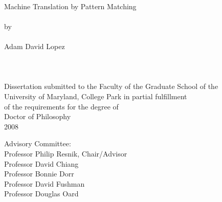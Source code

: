 
\thispagestyle{empty}
\hbox{\ }
\vspace{1in}
\small\normalsize
\begin{center}

\huge{{\sc Machine Translation by Pattern Matching}}\\
\ \\
\large{by} \\
\ \\
\large{Adam David Lopez}%
\ \\
\ \\
\ \\
\ \\
\normalsize
Dissertation submitted to the Faculty of the Graduate School of the \\
University of Maryland, College Park in partial fulfillment \\
of the requirements for the degree of \\
Doctor of Philosophy \\
2008
\end{center}

\vspace{7.5em}

\noindent Advisory Committee: \\
Professor Philip Resnik, Chair/Advisor \\
Professor David Chiang \\
Professor Bonnie Dorr \\
Professor David Fushman \\
Professor Douglas Oard
